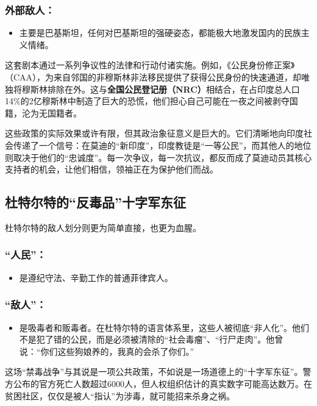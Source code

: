\subsubsection{外部敌人：}
\begin{itemize}
\item 主要是巴基斯坦，任何对巴基斯坦的强硬姿态，都能极大地激发国内的民族主义情绪。
\end{itemize}
这套剧本通过一系列争议性的法律和行动付诸实施。例如，《公民身份修正案》（CAA），为来自邻国的非穆斯林非法移民提供了获得公民身份的快速通道，却唯独将穆斯林排除在外。这与\textbf{全国公民登记册（NRC）}相结合，在占印度总人口14\%的2亿穆斯林中制造了巨大的恐慌，他们担心自己可能在一夜之间被剥夺国籍，沦为无国籍者。

这些政策的实际效果或许有限，但其政治象征意义是巨大的。它们清晰地向印度社会传递了一个信号：在莫迪的``新印度''，印度教徒是``一等公民''，而其他人的地位则取决于他们的``忠诚度''。每一次争议，每一次抗议，都反而成了莫迪动员其核心支持者的机会，让他们相信，领袖正在为保护他们而战。

\subsection{杜特尔特的``反毒品''十字军东征}

杜特尔特的敌人划分则更为简单直接，也更为血腥。

\subsubsection{``人民''：}
\begin{itemize}
\item 是遵纪守法、辛勤工作的普通菲律宾人。
\end{itemize}

\subsubsection{``敌人''：}
\begin{itemize}
\item 是吸毒者和贩毒者。在杜特尔特的语言体系里，这些人被彻底``非人化''。他们不是犯了错的公民，而是必须被清除的``社会毒瘤''、``行尸走肉''。他曾说：``你们这些狗娘养的，我真的会杀了你们。''
\end{itemize}
这场``禁毒战争''与其说是一项公共政策，不如说是一场道德上的``十字军东征''。警方公布的官方死亡人数超过6000人，但人权组织估计的真实数字可能高达数万。在贫困社区，仅仅是被人``指认''为涉毒，就可能招来杀身之祸。

